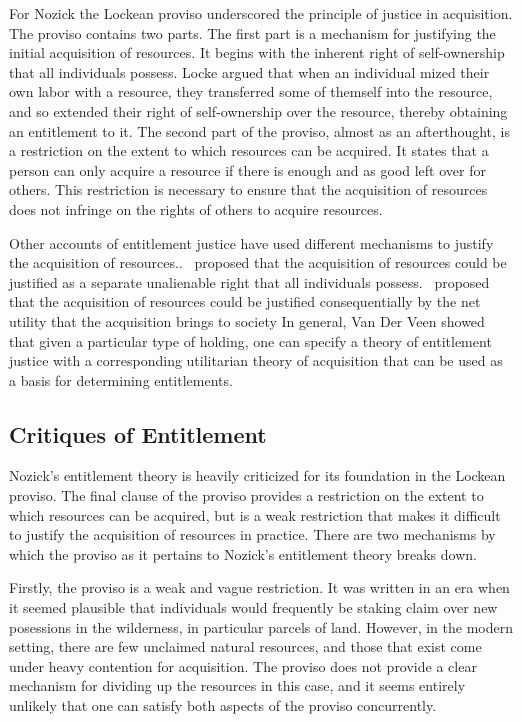 For Nozick the Lockean proviso underscored the principle of justice in
acquisition. The proviso contains two parts. The first part is a mechanism for 
justifying the initial acquisition of resources. It begins with the inherent 
right of self-ownership that all individuals possess. Locke argued that when 
an individual mized their own labor with a resource, they transferred some of 
themself into the resource, and so extended their right of self-ownership over 
the resource, thereby obtaining an entitlement to it. The second part of the
proviso, almost as an afterthought, is a restriction on the extent to which 
resources can be acquired. It states that a person can only acquire a resource
if there is enough and as good left over for others. This restriction is
necessary to ensure that the acquisition of resources does not infringe on the
rights of others to acquire resources.

Other accounts of entitlement justice have used different mechanisms to justify
the acquisition of resources..~\cite{Mack_1990} proposed that the acquisition of
resources could be justified as a separate unalienable right that all
individuals possess.~\cite{Van_der_Veen_1985} proposed that the acquisition of
resources could be justified consequentially by the net utility that the
acquisition brings to society In general, Van Der Veen showed that given a
particular type of holding, one can specify a theory of entitlement justice with
a corresponding utilitarian theory of acquisition that can be used as a basis
for determining entitlements.

\subsection{Critiques of Entitlement}

Nozick's entitlement theory is heavily criticized for its foundation in the
Lockean proviso. The final clause of the proviso provides a restriction on the
extent to which resources can be acquired, but is a weak restriction that makes
it difficult to justify the acquisition of resources in practice. There are two 
mechanisms by which the proviso as it pertains to Nozick's entitlement theory 
breaks down.

Firstly, the proviso is a weak and vague restriction. It was written in an era 
when it seemed plausible that individuals would frequently be staking claim over
new posessions in the wilderness, in particular parcels of land. However, in the
modern setting, there are few unclaimed natural resources, and those that exist
come under heavy contention for acquisition. The proviso does not provide a
clear mechanism for dividing up the resources in this case, and it seems
entirely unlikely that one can satisfy both aspects of the proviso concurrently.


